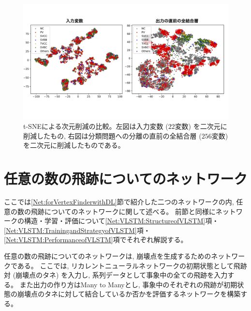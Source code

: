 \begin{figure}[htbp]
 \centering
 \includegraphics[width=1.0\textwidth]{Figure/3Networks/3-3-3-3tSNE.png}
 \caption[t-SNEによる次元削減の比較]{t-SNEによる次元削減の比較。左図は入力変数 ($22$変数) を二次元に削減したもの, 右図は分類問題への分離の直前の全結合層 ($256$変数) を二次元に削減したものである。}
 \label{3-3-3-3tSNE}
\end{figure}


\section{任意の数の飛跡についてのネットワーク} \label{Net:VertexLSTM}

ここでは\ref{Net:forVertexFinderwithDL}節で紹介した二つのネットワークの内, 任意の数の飛跡についてのネットワークに関して述べる。
前節と同様にネットワークの構造・学習・評価について\ref{Net:VLSTM:StructureofVLSTM}項・\ref{Net:VLSTM:TrainingandStrategyofVLSTM}項・\ref{Net:VLSTM:PerformanceofVLSTM}項でそれぞれ解説する。

任意の数の飛跡についてのネットワークは, 崩壊点を生成するためのネットワークである。
ここでは, リカレントニューラルネットワークの初期状態として飛跡対 (崩壊点のタネ) を入力し, 系列データとして事象中の全ての飛跡を入力する。
また出力の作り方はMany to Manyとし, 事象中のそれぞれの飛跡が初期状態の崩壊点のタネに対して結合しているか否かを評価するネットワークを構築する。

